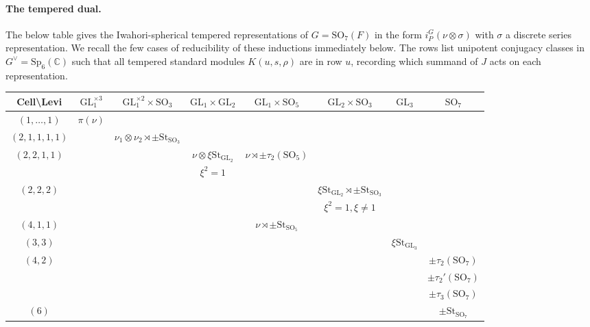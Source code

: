 \documentclass[10pt]{article}
\newcommand{\C}{\mathbb{C}}
\newcommand{\GL}{\mathrm{GL}}
\newcommand{\SO}{\mathrm{SO}}
\newcommand{\Sp}{\mathrm{Sp}}
\newcommand{\St}{\mathrm{St}}
\theoremstyle{definition}
\theoremstyle{remark}
\newcommand{\Gd}{G^\vee}
\begin{document}
\paragraph{The tempered dual.}
The below table gives the Iwahori-spherical tempered representations of $G=\SO_7(F)$
in the form $i_P^G(\nu\otimes\sigma)$ with $\sigma$ a discrete series representation. We recall
the few cases of reducibility of these inductions immediately below. The rows list unipotent conjugacy 
classes in $\Gd=\Sp_6(\C)$ such that all  tempered standard modules $K(u,s,\rho)$ are in row $u$,
recording which summand of $J$ acts on each representation.

\begin{center}
\begin{tabular}{|c|c|c|c|c|c|c|c|}
\hline 
Cell\textbackslash Levi & $\GL_1^{\times 3}$ & $\GL_1^{\times 2}\times\SO_3$ & $\GL_1\times\GL_2$ & $\GL_1\times\SO_5$ & $\GL_2\times\SO_3$ & $\GL_3$ & $\SO_7$  \\ 
\hline 
$(1,\dots, 1)$ & $\pi(\nu)$ &  &  &  &  &  &  \\ 
\hline 
$(2,1,1,1, 1)$ &  & $\nu_1\otimes\nu_2\rtimes\pm\St_{\SO_3}$ &  &  &  &  &   \\ 
\hline 
$(2,2,1,1)$ &  &  & $\nu\otimes\xi\St_{\GL_2}$ & $\nu\rtimes\pm\tau_2(\SO_5)$ &  &  &   \\ 
 &  &  & $\xi^2=1$ &  &  &  &   \\ 
\hline 
$(2,2,2)$ &  &  &  &  & $\xi\St_{\GL_2}\rtimes\pm\St_{\SO_3}$ &  &   \\ 
&  &  &  &  & $\xi^2=1,\xi\neq 1$ &  &   \\ 
\hline 
$(4,1,1)$ &  &  &  & $\nu\rtimes\pm\St_{\SO_5}$ &  &  &   \\ 
\hline 
$(3,3)$ &  &  &  &  &  & $\xi\St_{\GL_3}$ &   \\ 
\hline 
$(4,2)$ &  &  &  &  &  &  & $\pm\tau_2(\SO_7)$  \\ 
&  &  &  &  &  &  & $\pm\tau_2'(\SO_7)$  \\ 
&  &  &  &  &  &  & $\pm\tau_3(\SO_7)$  \\ 
\hline
$(6)$ &  &  &  &  &  &  & $\pm\St_{\SO_7}$  \\ 
\hline 
\end{tabular} 
\end{center}
% 
\vspace{5mm}
\end{document}
